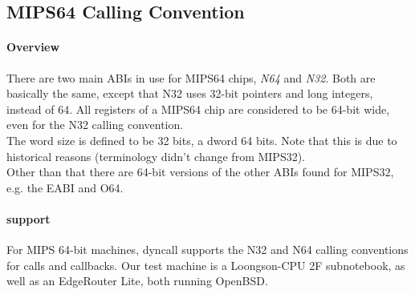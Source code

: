 %
%
%
%

\subsection{MIPS64 Calling Convention}

\paragraph{Overview}

There are two main ABIs in use for MIPS64 chips, \emph{N64}\cite{MIPSn32/n64} and \emph{N32}\cite{MIPSn32/n64}. Both are
basically the same, except that N32 uses 32-bit pointers and long integers, instead of 64. All registers of a MIPS64 chip are considered
to be 64-bit wide, even for the N32 calling convention.\\
The word size is defined to be 32 bits, a dword 64 bits. Note that this is due to historical reasons (terminology didn't change from MIPS32).\\
Other than that there are 64-bit versions of the other ABIs found for MIPS32, e.g. the EABI\cite{MIPSeabi} and O64\cite{MIPSo64}.

\paragraph{ support}

For MIPS 64-bit machines, dyncall supports the N32 and N64 calling conventions for calls and callbacks.
Our test machine is a Loongson-CPU 2F subnotebook, as well as an EdgeRouter Lite, both running OpenBSD.

